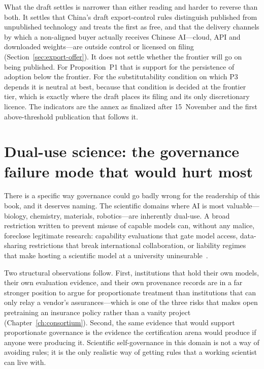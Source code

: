What the draft settles is narrower than either reading and harder to reverse than both. It settles that China's draft export-control rules distinguish published from unpublished technology and treats the first as free, and that the delivery channels by which a non-aligned buyer actually receives Chinese AI---cloud, API and downloaded weights---are outside control or licensed on filing (Section~\ref{sec:export-offer}). It does not settle whether the frontier will go on being published. For Proposition~P1 that is support for the persistence of adoption below the frontier. For the substitutability condition on which P3 depends it is neutral at best, because that condition is decided at the frontier tier, which is exactly where the draft places its filing and its only discretionary licence. The indicators are the annex as finalized after 15~November and the first above-threshold publication that follows it.

\section{Dual-use science: the governance failure mode that would hurt most}

There is a specific way governance could go badly wrong for the readership of this book, and it deserves naming. The scientific domains where AI is most valuable---biology, chemistry, materials, robotics---are inherently dual-use. A broad restriction written to prevent misuse of capable models can, without any malice, foreclose legitimate research: capability evaluations that gate model access, data-sharing restrictions that break international collaboration, or liability regimes that make hosting a scientific model at a university uninsurable~\cite{consortium-record}.

Two structural observations follow. First, institutions that hold their own models, their own evaluation evidence, and their own provenance records are in a far stronger position to argue for proportionate treatment than institutions that can only relay a vendor's assurances---which is one of the three risks that makes open pretraining an insurance policy rather than a vanity project (Chapter~\ref{ch:consortium}). Second, the same evidence that would support proportionate governance is the evidence the certification arena would produce if anyone were producing it. Scientific self-governance in this domain is not a way of avoiding rules; it is the only realistic way of getting rules that a working scientist can live with.

